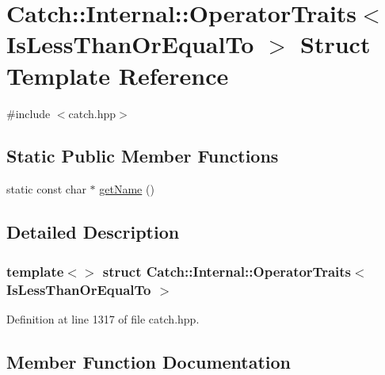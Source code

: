 \hypertarget{struct_catch_1_1_internal_1_1_operator_traits_3_01_is_less_than_or_equal_to_01_4}{}\section{Catch\+:\+:Internal\+:\+:Operator\+Traits$<$ Is\+Less\+Than\+Or\+Equal\+To $>$ Struct Template Reference}
\label{struct_catch_1_1_internal_1_1_operator_traits_3_01_is_less_than_or_equal_to_01_4}


{\ttfamily \#include $<$catch.\+hpp$>$}

\subsection*{Static Public Member Functions}
\begin{DoxyCompactItemize}
\item 
static const char $\ast$ \hyperlink{struct_catch_1_1_internal_1_1_operator_traits_3_01_is_less_than_or_equal_to_01_4_ae8578813bc847838f10448c1541a9d7b}{get\+Name} ()
\end{DoxyCompactItemize}


\subsection{Detailed Description}
\subsubsection*{template$<$$>$\newline
struct Catch\+::\+Internal\+::\+Operator\+Traits$<$ Is\+Less\+Than\+Or\+Equal\+To $>$}



Definition at line 1317 of file catch.\+hpp.



\subsection{Member Function Documentation}
\hypertarget{struct_catch_1_1_internal_1_1_operator_traits_3_01_is_less_than_or_equal_to_01_4_ae8578813bc847838f10448c1541a9d7b}{}\label{struct_catch_1_1_internal_1_1_operator_traits_3_01_is_less_than_or_equal_to_01_4_ae8578813bc847838f10448c1541a9d7b} 
